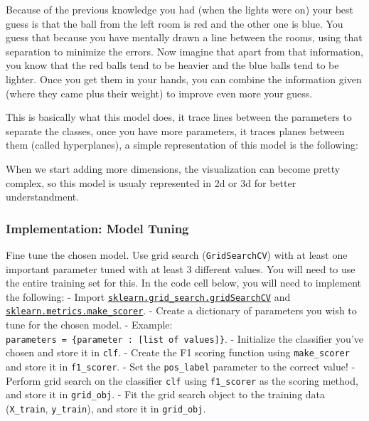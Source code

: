 \documentclass[11pt]{article}
\begin{document}
Because of the previous knowledge you had (when the lights were on) your
best guess is that the ball from the left room is red and the other one
is blue. You guess that because you have mentally drawn a line between
the rooms, using that separation to minimize the errors. Now imagine
that apart from that information, you know that the red balls tend to be
heavier and the blue balls tend to be lighter. Once you get them in your
hands, you can combine the information given (where they came plus their
weight) to improve even more your guess.

This is basically what this model does, it trace lines between the
parameters to separate the classes, once you have more parameters, it
traces planes between them (called hyperplanes), a simple representation
of this model is the following:

When we start adding more dimensions, the visualization can become
pretty complex, so this model is usualy represented in 2d or 3d for
better understandment.

    \subsubsection{Implementation: Model
Tuning}\label{implementation-model-tuning}

Fine tune the chosen model. Use grid search (\texttt{GridSearchCV}) with
at least one important parameter tuned with at least 3 different values.
You will need to use the entire training set for this. In the code cell
below, you will need to implement the following: - Import
\href{http://scikit-learn.org/stable/modules/generated/sklearn.grid_search.GridSearchCV.html}{\texttt{sklearn.grid\_search.gridSearchCV}}
and
\href{http://scikit-learn.org/stable/modules/generated/sklearn.metrics.make_scorer.html}{\texttt{sklearn.metrics.make\_scorer}}.
- Create a dictionary of parameters you wish to tune for the chosen
model. - Example:
\texttt{parameters\ =\ \{\textquotesingle{}parameter\textquotesingle{}\ :\ {[}list\ of\ values{]}\}}.
- Initialize the classifier you've chosen and store it in \texttt{clf}.
- Create the F1 scoring function using \texttt{make\_scorer} and store
it in \texttt{f1\_scorer}. - Set the \texttt{pos\_label} parameter to
the correct value! - Perform grid search on the classifier \texttt{clf}
using \texttt{f1\_scorer} as the scoring method, and store it in
\texttt{grid\_obj}. - Fit the grid search object to the training data
(\texttt{X\_train}, \texttt{y\_train}), and store it in
\texttt{grid\_obj}.
\end{document}
